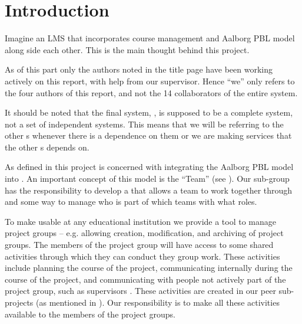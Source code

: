 \chapter{Introduction}
\label{chap:introProjectgroup}
Imagine an LMS that incorporates course management and Aalborg PBL model along side each other.
This is the main thought behind this project.

As of this part only the authors noted in the title page have been working actively on this report, with help from our supervisor.
Hence ``we'' only refers to the four authors of this report, and not the 14 collaborators of the entire system.

It should be noted that the final system, \system{}, is supposed to be a complete system, not a set of independent systems.
This means that we will be referring to the other \subsystem{}s whenever there is a dependence on them or we are making services that the other \subsystem{}s depends on.



As defined in  this project is concerned with integrating the Aalborg PBL model into \moodle.
An important concept of this model is the ``Team'' (see ).
Our sub-group has the responsibility to develop a \subsystem{} that allows a team to work together through \moodle{} and some way to manage who is part of which teams with what roles.






To make \system{} usable at any educational institution we provide a tool to manage project groups -- e.g. allowing creation, modification, and archiving of project groups.
The members of the project group will have access to some shared activities through which they can conduct they group work.
These activities include planning the course of the project, communicating internally during the course of the project, and communicating with people not actively part of the project group, such as supervisors .
These activities are created in our peer sub-projects (as mentioned in ).
Our responsibility is to make all these activities available to the members of the project groups.




